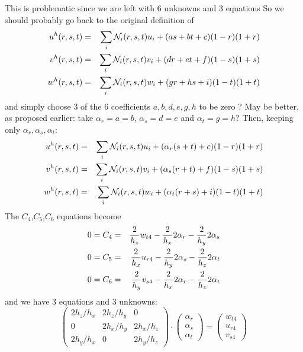 This is problematic since we are left with 6 unknowns and 3 equations
So we should probably go back to the original definition of 
\begin{eqnarray}
u^h(r,s,t)&=&\sum_i {\mathcal{N}}_i(r,s,t) u_i + (a s + b t +c)(1-r)(1+r) \nonumber\\
v^h(r,s,t)&=&\sum_i {\mathcal{N}}_i(r,s,t) v_i + (d r + e t +f)(1-s)(1+s) \nonumber\\
w^h(r,s,t)&=&\sum_i {\mathcal{N}}_i(r,s,t) w_i + (g r + h s +i)(1-t)(1+t) \nonumber
\end{eqnarray}
and simply choose 3 of the 6 coefficients $a,b,d,e,g,h$ to be zero ? 
May be better, as proposed earlier: take $\alpha_r=a=b$, 
$\alpha_s=d=e$ and $\alpha_t=g=h$? Then, keeping only $\alpha_r,\alpha_s,\alpha_t$:
\begin{eqnarray}
u^h(r,s,t)&=&\sum_i {\mathcal{N}}_i(r,s,t) u_i + (\alpha_r (s + t) +c)(1-r)(1+r) \nonumber\\
v^h(r,s,t)&=&\sum_i {\mathcal{N}}_i(r,s,t) v_i + (\alpha_s (r + t) +f)(1-s)(1+s) \nonumber\\
w^h(r,s,t)&=&\sum_i {\mathcal{N}}_i(r,s,t) w_i + (\alpha_t (r + s) +i)(1-t)(1+t) \nonumber
\end{eqnarray}
The $C_4$,$C_5$,$C_6$ equations become 
\begin{eqnarray}
0=C_4 &=& \frac{2}{h_z} w_{t4} - \frac{2}{h_x} 2\alpha_r - \frac{2}{h_y}  2\alpha_s  \nn\\ %
0=C_5 &=& \frac{2}{h_x} u_{r4} - \frac{2}{h_y} 2\alpha_s - \frac{2}{h_z}  2\alpha_t  \nn\\ %
0=C_6 &=& \frac{2}{h_y} v_{s4} - \frac{2}{h_x} 2\alpha_r - \frac{2}{h_z}  2\alpha_t  \nn %
\end{eqnarray}
and we have 3 equations and 3 unknowns:
\[
\left(
\begin{array}{ccc}
2h_z/h_x & 2h_z/h_y & 0 \\
0        & 2h_x/h_y & 2h_x/h_z \\
2h_y/h_x & 0        & 2h_y/h_z
\end{array}
\right)
\cdot
\left(
\begin{array}{c}
\alpha_r \\ \alpha_s \\ \alpha_t
\end{array}
\right)
=
\left(
\begin{array}{c}
w_{t4} \\
u_{r4} \\
v_{s4} 
\end{array}
\right)
\]

